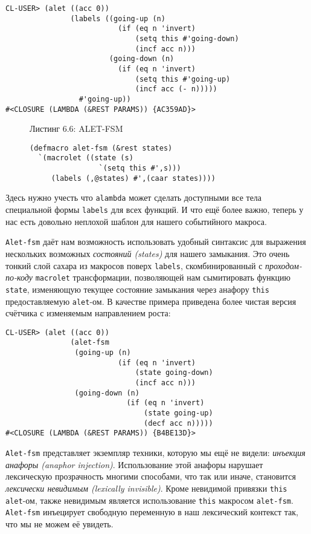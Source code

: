 \begin{verbatim}
CL-USER> (alet ((acc 0))
               (labels ((going-up (n)
                          (if (eq n 'invert)
                              (setq this #'going-down)
                              (incf acc n)))
                        (going-down (n)
                          (if (eq n 'invert)
                              (setq this #'going-up)
                              (incf acc (- n)))))
                 #'going-up))
#<CLOSURE (LAMBDA (&REST PARAMS)) {AC359AD}>
\end{verbatim}

\begin{figure}Листинг 6.6: ALET-FSM\label{listing_6.6}
\listbegin
\begin{verbatim}
(defmacro alet-fsm (&rest states)
  `(macrolet ((state (s)
                `(setq this #',s)))
     (labels (,@states) #',(caar states))))
\end{verbatim}
\listend
\end{figure}

Здесь нужно учесть что \verb"alambda" может сделать доступными все тела специальной формы \verb"labels" для всех функций. И что ещё более важно, теперь у нас есть довольно неплохой шаблон для нашего событийного макроса.

\verb"Alet-fsm" даёт нам возможность использовать удобный синтаксис для выражения нескольких возможных \emph{состояний (states)} для нашего замыкания. Это очень тонкий слой сахара из макросов поверх \verb"labels", скомбинированный с \emph{проходом-по-коду} \verb"macrolet" трансформации, позволяющей нам сымитировать функцию \verb"state", изменяющую текущее состояние замыкания через анафору \verb"this" предоставляемую \verb"alet"-ом. В качестве примера приведена более чистая версия счётчика с изменяемым направлением роста:

\begin{verbatim}
CL-USER> (alet ((acc 0))
               (alet-fsm
                (going-up (n)
                          (if (eq n 'invert)
                              (state going-down)
                              (incf acc n)))
                (going-down (n)
                            (if (eq n 'invert)
                                (state going-up)
                                (decf acc n)))))
#<CLOSURE (LAMBDA (&REST PARAMS)) {B4BE13D}>
\end{verbatim}

\verb"Alet-fsm" представляет экземпляр техники, которую мы ещё не видели: \emph{инъекция анафоры (anaphor injection)}. Использование этой анафоры нарушает лексическую прозрачность многими способами, что так или иначе, становится \emph{лексически невидимым (lexically invisible)}. Кроме невидимой привязки \verb"this" \verb"alet"-ом, также невидимым является использование \verb"this" макросом \verb"alet-fsm". \verb"Alet-fsm" инъецирует свободную переменную в наш лексический контекст так, что мы не можем её увидеть.

